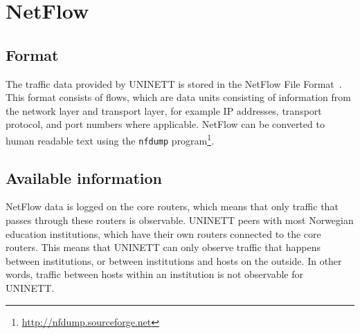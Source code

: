 \chapter{NetFlow}
\label{chp:netflow}

\section{Format}
The traffic data provided by UNINETT is stored in the NetFlow File Format~\cite{cisco0netflow}.
This format consists of flows, which are data units consisting of information from the \gls{network layer} and \gls{transport layer},
 for example IP addresses, transport protocol, and port numbers where applicable.
NetFlow can be converted to human readable text using the \verb"nfdump" program\footnote{\url{http://nfdump.sourceforge.net}}.

\section{Available information}
%
%
NetFlow data is logged on the core routers, which means that only traffic that passes through these routers is observable.
UNINETT peers with most Norwegian education institutions, which have their own routers connected to the core routers.
This means that UNINETT can only observe traffic that happens between institutions, or between institutions and hosts on the outside.
In other words, traffic between hosts within an institution is not observable for UNINETT.

